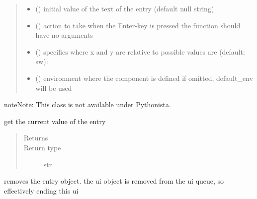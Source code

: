 \documentclass[letterpaper,10pt,english]{sphinxmanual}
\begin{document}
\begin{fulllineitems}
\begin{quote}
\begin{description}
\begin{itemize}
\item {} 
 () \textendash{} initial value of the text of the entry (default null string) 

\item {} 
 () \textendash{} action to take when the Enter-key is pressed 
the function should have no arguments 

\item {} 
 () \textendash{} specifies where x and y are relative to 
possible values are (default: sw): 

\item {} 
 ({\hyperref[\detokenize{Reference:salabim.Environment}]{}}) \textendash{} environment where the component is defined 
if omitted, default\_env will be used

\end{itemize}

\end{description}\end{quote}

\begin{sphinxadmonition}{note}{Note:}
This class is not available under Pythonista.
\end{sphinxadmonition}

\begin{fulllineitems}
\label{\detokenize{Reference:salabim.AnimateEntry.get}}
get the current value of the entry
\begin{quote}\begin{description}
\item[{Returns}] \leavevmode
{}

\item[{Return type}] \leavevmode
str

\end{description}\end{quote}

\end{fulllineitems}


\begin{fulllineitems}
\label{\detokenize{Reference:salabim.AnimateEntry.remove}}
removes the entry object. 
the ui object is removed from the ui queue,
so effectively ending this ui

\end{fulllineitems}


\end{fulllineitems}
\end{document}
